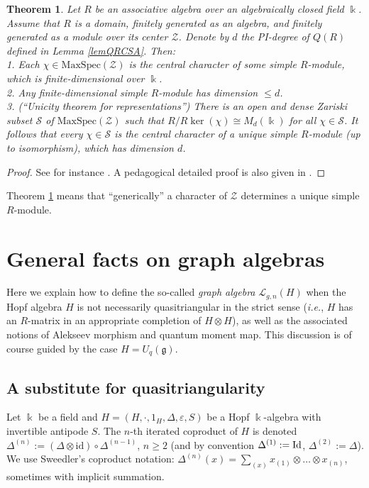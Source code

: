 \documentclass[11pt]{amsart}
\newtheorem{teo}{Theorem}[section]
\begin{document}
\begin{teo}\label{unicityThm}
Let $R$ be an associative algebra over an algebraically closed field $\Bbbk$. Assume that $R$ is a domain, finitely generated as an algebra, and finitely generated as a module over its center $\mathcal{Z}$. Denote by $d$ the PI-degree of $Q(R)$ defined in Lemma \ref{lemQRCSA}. Then:
\\1. Each $\chi \in \mathrm{MaxSpec}(\mathcal{Z})$ is the central character of some simple $R$-module, which is finite-dimensional over $\Bbbk$.
\\2. Any finite-dimensional simple $R$-module has dimension $\leq d$.
\\3. {\em (``Unicity theorem for representations'')} There is an open and dense Zariski subset $\mathcal{S}$ of $\mathrm{MaxSpec}(\mathcal{Z})$ such that $R\big/R\ker(\chi) \cong M_d(\Bbbk)$ for all $\chi \in \mathcal{S}$. It follows that every $\chi\in \mathcal{S}$ is the central character of a unique simple $R$-module (up to isomorphism), which has dimension $d$.
\end{teo}
\begin{proof}
See for instance \cite[\S III.1.6]{BG}. A pedagogical detailed proof is also given in \cite[\S 2]{FKL}. 
\end{proof}
\noindent Theorem \ref{unicityThm} means that ``generically'' a character of $\mathcal{Z}$ determines a unique simple $R$-module.


\section{General facts on graph algebras}\label{sectiongraphalg}
Here we explain how to define the so-called {\em graph algebra} $\mathcal{L}_{g,n}(H)$ when the Hopf algebra $H$ is not necessarily quasitriangular in the strict sense ({\it i.e.}, $H$ has an $R$-matrix in an appropriate completion of $H\otimes H$), as well as the associated notions of Alekseev morphism and quantum moment map. This discussion is of course guided by the case $H = U_q(\mathfrak{g})$.

\subsection{A substitute for quasitriangularity}\label{subsecSubstQuasi}
Let $\Bbbk$  be a field and $H = (H,\cdot,1_H,\Delta,\varepsilon,S)$ be a Hopf $\Bbbk$-algebra with invertible antipode $S$. The $n$-th iterated coproduct of $H$ is denoted $\Delta^{(n)} := (\Delta \otimes \mathrm{id})\circ \Delta^{(n-1)}$, $n\geq 2$ (and by convention $\Delta^{(1)} :={\rm Id}$, $\Delta^{(2)} := \Delta$). We use Sweedler's coproduct notation: $\Delta^{(n)}(x) = \textstyle \sum_{(x)} x_{(1)}\otimes \ldots \otimes x_{(n)}$, sometimes with implicit summation.
\end{document}

